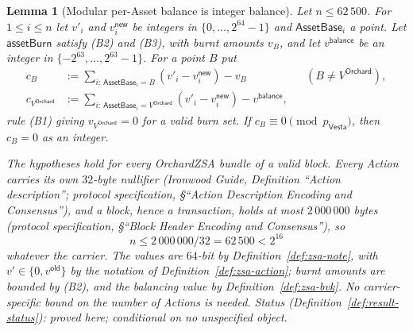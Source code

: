 \documentclass[11pt,a4paper]{article}
\newtheorem{lemma}[theorem]{Lemma}
\theoremstyle{definition}
\newcommand{\Vesta}{\ensuremath{\mathsf{Vesta}}}
\begin{document}
\begin{lemma}[Modular per-Asset balance is integer balance]
\label{lem:zsa-integer}
Let $n \le 62\,500$. For $1 \le i \le n$ let $v'_i$ and $v^{\mathsf{new}}_i$
be integers in $\{0, \dots, 2^{64} - 1\}$ and $\mathsf{AssetBase}_i$ a
point. Let $\mathsf{assetBurn}$ satisfy (B2) and (B3), with burnt amounts
$v_B$, and let $v^{\mathsf{balance}}$ be an integer in
$\{-2^{63}, \dots, 2^{63} - 1\}$. For a point $B$ put
\begin{align*}
  c_B &:= \sum_{i :\, \mathsf{AssetBase}_i = B}
    (v'_i - v^{\mathsf{new}}_i) - v_B
    && (B \neq V^{\mathsf{Orchard}}), \\
  c_{V^{\mathsf{Orchard}}} &:= \sum_{i :\, \mathsf{AssetBase}_i =
    V^{\mathsf{Orchard}}} (v'_i - v^{\mathsf{new}}_i)
    - v^{\mathsf{balance}},
\end{align*}
rule (B1) giving $v_{V^{\mathsf{Orchard}}} = 0$ for a valid burn set. If
$c_B \equiv 0 \pmod{p_{\Vesta}}$, then $c_B = 0$ as an integer.

The hypotheses hold for every OrchardZSA bundle of a valid block. Every
Action carries its own $32$-byte nullifier (\emph{Ironwood Guide},
Definition ``Action description''; protocol specification, \S``Action
Description Encoding and Consensus''), and a block, hence a transaction,
holds at most $2\,000\,000$ bytes (protocol specification, \S``Block Header
Encoding and Consensus''), so
\[
  n \le 2\,000\,000 / 32 = 62\,500 < 2^{16}
\]
whatever the carrier. The values are $64$-bit by
Definition~\ref{def:zsa-note}, with $v' \in \{0, v^{\mathsf{old}}\}$ by the
notation of Definition~\ref{def:zsa-action}; burnt amounts are bounded by
(B2), and the balancing value by Definition~\ref{def:zsa-bvk}. No
carrier-specific bound on the number of Actions is needed. Status
(Definition~\ref{def:result-status}): proved here; conditional on no
unspecified object.
\end{lemma}
\end{document}
